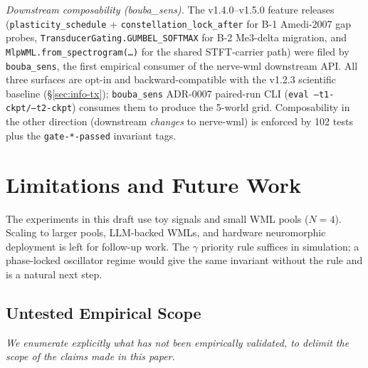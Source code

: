 \documentclass[10pt,twocolumn]{article}
\begin{document}
\textit{Downstream composability (bouba\_sens).}
The v1.4.0--v1.5.0 feature releases (\texttt{plasticity\_schedule} +
\texttt{constellation\_lock\_after} for B-1 Amedi-2007 gap probes,
\texttt{TransducerGating.GUMBEL\_SOFTMAX} for B-2 Me3-delta migration,
and \texttt{MlpWML.from\_spectrogram(\ldots)} for the shared STFT-carrier
path) were filed by \texttt{bouba\_sens}, the first empirical consumer
of the nerve-wml downstream API. All three surfaces are opt-in and
backward-compatible with the v1.2.3 scientific baseline
(\S\ref{sec:info-tx}); \texttt{bouba\_sens} ADR-0007 paired-run CLI
(\texttt{eval --t1-ckpt/--t2-ckpt}) consumes them to produce the
5-world grid. Composability in the other direction (downstream
\emph{changes} to nerve-wml) is enforced by 102 tests plus the
\texttt{gate-*-passed} invariant tags.

\section{Limitations and Future Work}
The experiments in this draft use toy signals and small WML pools
($N=4$). Scaling to larger pools, LLM-backed WMLs, and hardware
neuromorphic deployment is left for follow-up work. The $\gamma$
priority rule suffices in simulation; a phase-locked oscillator
regime would give the same invariant without the rule and is a
natural next step.

\subsection{Untested Empirical Scope}

\emph{We enumerate explicitly what has not been empirically validated, to delimit the scope of the claims made in this paper.}
\end{document}

